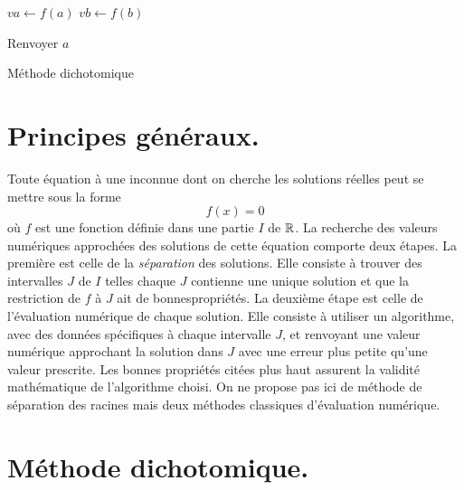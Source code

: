 

\begin{algorithm}
  $va\leftarrow f(a)$\;
  $vb\leftarrow f(b)$\;
  
  Renvoyer $a$\;
  \caption{Méthode dichotomique}
  \label{resolnumequ_1}
\end{algorithm}


\section{Principes généraux.}
Toute équation à une inconnue dont on cherche les solutions réelles peut se mettre sous la forme
\begin{displaymath}
  f(x) = 0
\end{displaymath}
où $f$ est une fonction définie dans une partie $I$ de $\mathbb{R}$. La recherche des valeurs numériques approchées des solutions de cette équation comporte deux étapes.\newline
La première est celle de la \emph{séparation} des solutions. Elle consiste à trouver des intervalles $J$ de $I$ telles chaque $J$ contienne une unique solution et que la restriction de $f$ à $J$ ait de \og bonnes\fg  propriétés. \newline 
La deuxième étape est celle de l'évaluation numérique de chaque solution. Elle consiste à utiliser un algorithme, avec des données spécifiques à chaque intervalle $J$, et renvoyant une valeur numérique approchant la solution dans $J$ avec une erreur plus petite qu'une valeur prescrite. Les bonnes propriétés citées plus haut assurent la validité mathématique de l'algorithme choisi.\newline
On ne propose pas ici de méthode de séparation des racines mais deux méthodes classiques d'évaluation numérique.

\section{Méthode dichotomique.}
